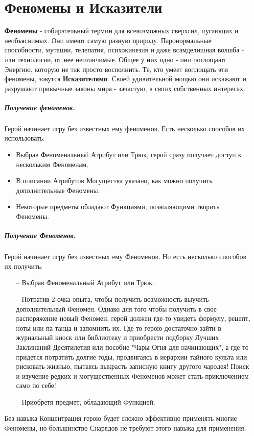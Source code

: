\chapter{Феномены и Исказители}
\textbf{Феномены} - собирательный термин для всевозможных сверхсил, пугающих и необъяснимых. Они имеют самую разную природу. Паронормальные способности, мутации, телепатия, психокинезия и даже всамделишная волшба - или технологии, от нее неотличимые. Общее у них одно - они поглощают Энергию, которую не так просто восполнить. Те, кто умеет воплощать эти феномены, зовутся \textbf{Исказителями}. Своей удивительной мощью они искажают и разрушают привычные законы мира - зачастую, в своих собственных интересах.
\paragraph{Получение феноменов.} Герой начинает игру без известных ему феноменов. Есть несколько способов их использовать:
\begin{itemize}
  \item Выбрав Феноменальный Атрибут или Трюк, герой сразу получает доступ к нескольким Феноменам.
  \item В описании Атрибутов Могущества указано, как можно получить дополнительные Феномены.
  \item Некоторые предметы обладают Функциями, позволяющими творить Феномены.
\end{itemize}




\paragraph{Получение Феноменов.} Герой начинает игру без известных ему Феноменов. Но есть несколько способов их получить:
\begin{itemize}
\item[--] Выбрав Феноменальный Атрибут или Трюк.
\item[--] Потратив 2 очка опыта, чтобы получить возможность выучить дополнительный Феномен.
\newline
Однако для того чтобы получить в свое распоряжение новый Феномен, герой должен где-то увидеть формулу, рецепт, ноты или па танца и запомнить их. Где-то герою достаточно зайти в журнальный киоск или библиотеку и приобрести подборку Лучших Заклинаний Десятилетия или пособие "Чары Огня для начинающих", а где-то придется потратить долгие годы, продвигаясь в иерархии тайного культа или рисковать жизнью, пытаясь выкрасть записную книгу другого чародея! Поиск и изучение редких и могущественных Феноменов может стать приключением само по себе!
\item[--] Приобретя предмет, обладающий Функцией.
\end{itemize}
\begin{tcolorbox}
Без навыка Концентрация герою будет сложно эффективно применять многие Феномены, но большинство Снарядов не требуют этого навыка для применения.
\end{tcolorbox}
